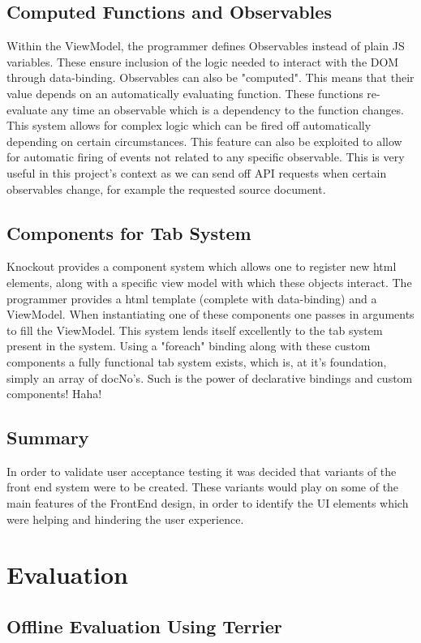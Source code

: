 \documentclass{l4proj}
\begin{document}
\section{Computed Functions and Observables}
Within the ViewModel, the programmer defines Observables instead of plain JS variables. These ensure inclusion of the logic needed to interact with the DOM through data-binding. Observables can also be "computed". This means that their value depends on an automatically evaluating function. These functions re-evaluate any time an observable which is a dependency to the function changes. This system allows for complex logic which can be fired off automatically depending on certain circumstances.
This feature can also be exploited to allow for automatic firing of events not related to any specific observable. This is very useful in this project's context as we can send off API requests when certain observables change, for example the requested source document.

\section{Components for Tab System}
Knockout provides a component system which allows one to register new html elements, along with a specific view model with which these objects interact. The programmer provides a html template (complete with data-binding) and a ViewModel. When instantiating one of these components one passes in arguments to fill the ViewModel.
This system lends itself excellently to the tab system present in the system. Using a "foreach" binding along with these custom components a fully functional tab system exists, which is, at it's foundation, simply an array of docNo's. Such is the power of declarative bindings and custom components! Haha!

\section{Summary}
In order to validate user acceptance testing it was decided that variants of the front end system were to be created. These variants would play on some of the main features of the FrontEnd design, in order to identify the UI elements which were helping and hindering the user experience.

\chapter{Evaluation}
\section{Offline Evaluation Using Terrier}
\end{document}
